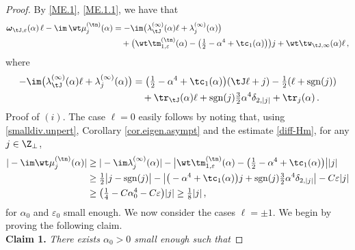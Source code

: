 \documentclass[a4paper,reqno,10pt]{article}
\newcommand{\bomega}{{\boldsymbol{\omega}}}
\begin{document}
\begin{proof}
    By \eqref{ME.1}, \eqref{ME.1.1}, we have that
    \begin{align}
        \bomega_{\tJ,\varepsilon}(\alpha)\,\ell  -\im\,\wt\mu_{j}^{(\tn)}(\alpha)  
        & = -\im \big( \lambda_{\tJ}^{(\infty)}(\alpha) \ell + \lambda_{j}^{(\infty)}(\alpha) \big)  \\
         & \quad + \big( \wt\tm_{1,\varepsilon}^{(\tn)}(\alpha) - \big( \tfrac12 -\alpha^4 + \tc_{1}(\alpha) \big)  \big)j + \wt\tw_{\tJ,\infty}(\alpha) \ell  \,,\label{smalldiv}
    \end{align}
    where
    \begin{align}
    	-\im \big( \lambda_{\tJ}^{(\infty)}(\alpha) \ell + \lambda_{j}^{(\infty)}(\alpha) \big)   & = \big( \tfrac12 - \alpha^4 +\tc_{1}(\alpha)  \big)(\tJ \ell +j) - \tfrac12(\ell +{\rm sgn}(j)) \\
    	&\quad+ \tr_{\tJ}(\alpha)\ell + {\rm sgn}(j)\tfrac32\alpha^4 \delta_{2,|j|} + \tr_{j}(\alpha)\,. \label{smalldiv.unpert}
    \end{align}
     {\sc Proof of $(i)$}. The case $\ell=0$ easily follows by noting that, using \eqref{smalldiv.unpert}, Corollary \ref{cor.eigen.asympt} and the estimate \eqref{diff-Hm}, for any $j\in \Z_{\perp}$,
      \begin{align}
         |-\im \wt\mu_{j}^{(\tn)}(\alpha)| & \geq |-\im \lambda_{j}^{(\infty)}(\alpha)|  -\big| \wt\tm_{1,\varepsilon}^{(\tn)}(\alpha) - \big( \tfrac12 -\alpha^4 + \tc_{1}(\alpha) \big)  \big| |j| \\
          & \geq \tfrac12 \big| j- {\rm sgn}(j) \big| - \big| \big(-\alpha^4 +\tc_{1}(\alpha) \big) j + {\rm sgn}(j) \tfrac32 \alpha^4 \delta_{2,|j|} \big| - C\varepsilon |j| \\
          & \geq \big( \tfrac14 - C \alpha_0^4 - C \varepsilon \big) |j| \geq \tfrac18 |j|\,,
      \end{align}
      for $\alpha_0$ and $\varepsilon_{0}$ small enough. We now consider the cases $\ell= \pm 1$. We begin by proving the following claim.
   \\[1mm]
   {\bf Claim 1.} {\it There exists $\alpha_{0}>0$ small enough such that}

\end{proof}
\end{document}
